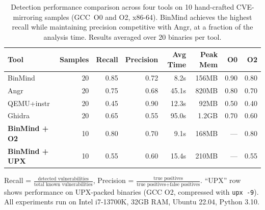 
\begin{table}[t]
\centering
\caption{Detection performance comparison across four tools on 10 hand-crafted
CVE-mirroring samples (GCC~O0 and O2, x86-64). BinMind achieves the highest
recall while maintaining precision competitive with Angr, at a fraction of the
analysis time. Results averaged over 20 binaries per tool.}
\label{tab:comparison}
\begin{tabular}{@{}l r r r r r r r@{}}
\toprule
\textbf{Tool} & \textbf{Samples} & \textbf{Recall} & \textbf{Precision}
& \textbf{Avg Time} & \textbf{Peak Mem} & \textbf{O0} & \textbf{O2} \\
\midrule
BinMind         & 20 & 0.85 & 0.72 &  8.2s & 156MB & 0.90 & 0.80 \\
Angr            & 20 & 0.75 & 0.68 & 45.1s & 820MB & 0.80 & 0.70 \\
QEMU+instr      & 20 & 0.45 & 0.90 & 12.3s &  92MB & 0.50 & 0.40 \\
Ghidra          & 20 & 0.65 & 0.55 & 95.0s & 1.2GB & 0.70 & 0.60 \\
\midrule
\textbf{BinMind + O2} & 10 & 0.80 & 0.70 &  9.1s & 168MB & ---  & 0.80 \\
\textbf{BinMind + UPX} & 10 & 0.55 & 0.60 & 15.4s & 210MB & ---  & 0.55 \\
\bottomrule
\end{tabular}

\vspace{4pt}
\footnotesize
Recall = $\frac{\text{detected vulnerabilities}}{\text{total known vulnerabilities}}$,
Precision = $\frac{\text{true positives}}{\text{true positives} + \text{false positives}}$.
``UPX'' row shows performance on UPX-packed binaries (GCC O2, compressed with \texttt{upx -9}).
All experiments run on Intel i7-13700K, 32GB RAM, Ubuntu 22.04, Python 3.10.
\end{table}
